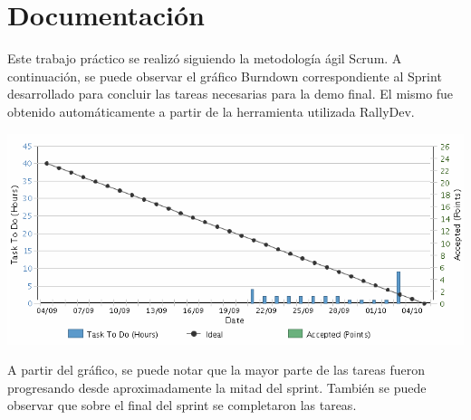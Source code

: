 \section{Documentación}

Este trabajo práctico se realizó siguiendo la metodología ágil Scrum.
A continuación, se puede observar el gráfico Burndown correspondiente al Sprint
desarrollado para concluir las tareas necesarias para la demo final.
El mismo fue obtenido automáticamente a partir de la herramienta utilizada RallyDev.
\newline


\centerline{\includegraphics[width=1\textwidth]{./imagenes/burndown.png}}



A partir del gráfico, se puede notar que la mayor parte de las tareas fueron progresando
desde aproximadamente la mitad del sprint. 
También se puede observar que sobre el final del sprint se completaron las tareas.
